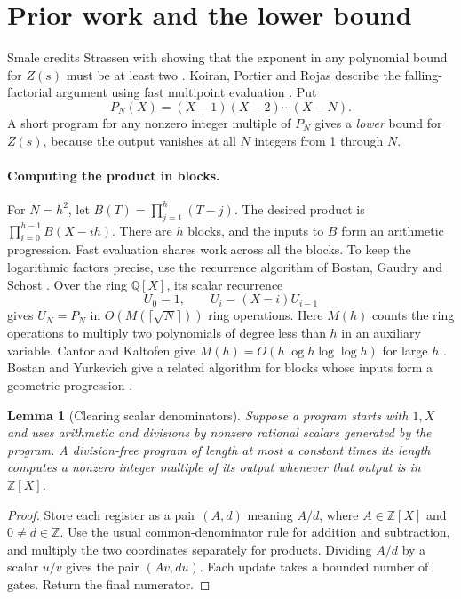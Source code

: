 \documentclass[11pt,letterpaper]{article}
\newtheorem{lemma}{Lemma}
\newcommand{\Z}{\mathbb Z}
\newcommand{\Q}{\mathbb Q}
\begin{document}
\clearpage
\section{Prior work and the lower bound}\label{sec:lower}
Smale credits Strassen with showing that the exponent in any polynomial
bound for \(Z(s)\) must be at least two \cite[Problem 4]{Smale}.
Koiran, Portier and Rojas describe the falling-factorial argument using
fast multipoint evaluation \cite[after Theorem 1.14]{KPR}. Put
\[
 P_N(X)=(X-1)(X-2)\cdots(X-N).
\]
A short program for any nonzero integer multiple of \(P_N\) gives a
\emph{lower} bound for \(Z(s)\), because the output vanishes at all
\(N\) integers from 1 through \(N\).

\paragraph{Computing the product in blocks.}
For \(N=h^2\), let \(B(T)=\prod_{j=1}^h(T-j)\). The desired product is
\(\prod_{i=0}^{h-1} B(X-ih)\). There are \(h\) blocks, and the inputs to
\(B\) form an arithmetic progression. Fast evaluation shares work across
all the blocks. To keep the logarithmic factors precise, use the recurrence
algorithm of Bostan, Gaudry and Schost \cite[Theorem 14]{BGS}. Over the
ring \(\Q[X]\), its scalar recurrence
\[
 U_0=1,\qquad U_i=(X-i)U_{i-1}
\]
gives \(U_N=P_N\) in \(O(M(\lceil\sqrt N\rceil))\) ring operations.
Here \(M(h)\) counts the ring operations to multiply two polynomials of
degree less than \(h\) in an auxiliary variable.
Cantor and Kaltofen give \(M(h)=O(h\log h\log\log h)\) for large \(h\)
\cite{CK}. Bostan and Yurkevich give a related algorithm for blocks
whose inputs form a geometric progression \cite{BY}.

\begin{lemma}[Clearing scalar denominators]\label{lem:scalar}
Suppose a program starts with \(1,X\) and uses arithmetic and divisions
by nonzero rational scalars generated by the program. A division-free
program of length at most a constant times its length computes a nonzero
integer multiple of its output whenever that output is in \(\Z[X]\).
\end{lemma}
\begin{proof}
Store each register as a pair \((A,d)\) meaning \(A/d\), where \(A\in\Z[X]\)
and \(0\ne d\in\Z\). Use the usual common-denominator rule for addition
and subtraction, and multiply the two coordinates separately for products.
Dividing \(A/d\) by a scalar \(u/v\) gives the pair \((Av,du)\). Each update
takes a bounded number of gates. Return the final numerator.
\end{proof}
\end{document}
